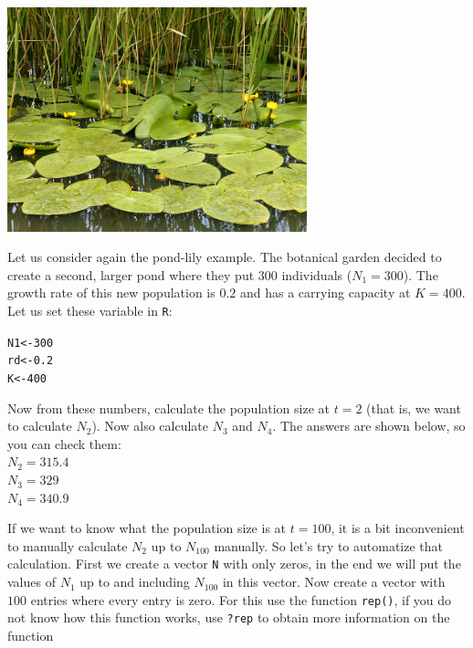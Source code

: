 \documentclass{article}\usepackage[]{graphicx}\usepackage[]{color}
\makeatletter
\newcommand{\hlnum}[1]{\textcolor[rgb]{0.686,0.059,0.569}{#1}}%
\newcommand{\hlstd}[1]{\textcolor[rgb]{0.345,0.345,0.345}{#1}}%
\newcommand{\hlkwb}[1]{\textcolor[rgb]{0.69,0.353,0.396}{#1}}%
\newenvironment{kframe}{%
 \def\at@end@of@kframe{}%
 \ifinner\ifhmode%
  \def\at@end@of@kframe{\end{minipage}}%
  \begin{minipage}{\columnwidth}%
 \fi\fi%
 \def\FrameCommand##1{\hskip\@totalleftmargin \hskip-\fboxsep
 \colorbox{shadecolor}{##1}\hskip-\fboxsep
     \hskip-\linewidth \hskip-\@totalleftmargin \hskip\columnwidth}%
 \MakeFramed {\advance\hsize-\width
   \@totalleftmargin\z@ \linewidth\hsize
   \@setminipage}}%
 {\par\unskip\endMakeFramed%
 \at@end@of@kframe}
\newenvironment{knitrout}{}{} %
\makeatother
\begin{document}
\vspace{1.5ex}

\begin{center}
\includegraphics[width=0.65\textwidth]{Pond_lily.jpg}
\end{center}
\vspace{1.5ex}

Let us consider again the pond-lily example. The botanical garden decided to create a second, larger pond where they put $300$ individuals ($N_1 = 300$). The growth rate of this new population is $0.2$ and has a carrying capacity at $K=400$. Let us set these variable in \texttt{R}:
\begin{knitrout}
\color{fgcolor}\begin{kframe}
\begin{alltt}
\hlstd{N1} \hlkwb{<-} \hlnum{300}
\hlstd{rd} \hlkwb{<-} \hlnum{0.2}
\hlstd{K} \hlkwb{<-} \hlnum{400}
\end{alltt}
\end{kframe}
\end{knitrout}
Now from these numbers, calculate the population size at $t=2$ (that is, we want to calculate $N_2$). Now also calculate $N_3$ and $N_4$. The answers are shown below, so you can check them:\\
$N_2 =  315.4 $\\$N_3 =  329 $\\$N_4 =  340.9 $

If we want to know what the population size is at $t=100$, it is a bit inconvenient to manually calculate $N_2$ up to $N_{100}$ manually. So let's try to automatize that calculation. First we create a vector \texttt{N} with only zeros, in the end we will put the values of $N_1$ up to and including $N_{100}$ in this vector. Now create a vector with $100$ entries where every entry is zero. For this use the function \texttt{rep()}, if you do not know how this function works, use \texttt{?rep} to obtain more information on the function
\end{document}
